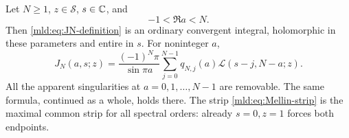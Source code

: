 \begin{theorem}\label{mld:thm:Mellin-master}
Let $N\ge1$, $z\in\mathcal S$, $s\in\mathbb C$, and
\begin{equation}\label{mld:eq:Mellin-strip}
 -1<\Re a<N.
\end{equation}
Then \eqref{mld:eq:JN-definition} is an ordinary convergent integral, holomorphic in these parameters and entire in $s$. For noninteger $a$,
\begin{equation}\label{mld:eq:Mellin-master}
 \boxed{\displaystyle
 J_N(a,s;z)=\frac{(-1)^N\pi}{\sin\pi a}
       \sum_{j=0}^{N-1}q_{N,j}(a)
          \mathcal L(s-j,N-a;z).}
\end{equation}
All the apparent singularities at $a=0,1,\ldots,N-1$ are removable. The same formula, continued as a whole, holds there. The strip \eqref{mld:eq:Mellin-strip} is the maximal common strip for all spectral orders: already $s=0,z=1$ forces both endpoints.
\end{theorem}

